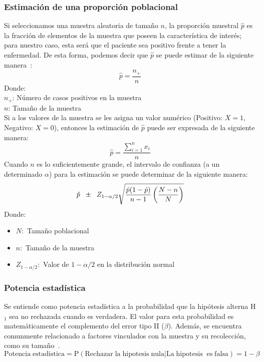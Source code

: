 \subsubsection{Estimación de una proporción poblacional}
Si seleccionamos una muestra aleatoria de tamaño $n$, la proporción muestral $\hat{p}$ es la fracción de elementos de la muestra que poseen la característica de interés; para nuestro caso, esta será que el paciente sea positivo frente a tener la enfermedad. De esta forma, podemos decir que $\hat{p}$ se puede estimar de la siguiente manera~\cite{scheaffer2006elementos}:
\begin{equation} \label{estpropcant}
    \hat{p} = \frac{n_+}{n}
\end{equation}
Donde:\\
\hspace*{2cm} $n_+$: Número de casos positivos en la muestra\\
\hspace*{2cm} $n$\hspace*{0.27cm}: Tamaño de la muestra\\
Si a los valores de la muestra se les asigna un valor numérico (Positivo: $X=1$, Negativo: $X=0$), entonces la estimación de $\hat{p}$ puede ser expresada de la siguiente manera:
\begin{equation}\label{estprop}
    \hat{p} = \frac{\sum_{i=1}^{n}{x_i}}{n}
\end{equation}
Cuando $n$ es lo suficientemente grande, el intervalo de confianza (a un determinado $\alpha$) para la estimación se puede determinar de la siguiente manera:
\begin{equation*}
    \hat{p} \hspace{0.2cm} \pm \hspace{0.2cm} Z_{1-\alpha/2} \sqrt{\frac{\hat{p}(1-\hat{p})}{n-1} \left( \frac{N-n}{N} \right)}
\end{equation*}
Donde:
\begin{itemize}[noitemsep,nolistsep]
    \item[] $N:$ Tamaño poblacional
    \item[] $n:$ Tamaño de la muestra
    \item[] $Z_{1-\alpha/2}:$ Valor de $1-\alpha/2$ en la distribución normal
\end{itemize}

\subsubsection{Potencia estadística}
Se entiende como potencia estadística a la probabilidad que la hipótesis alterna H$_{1}$ sea no rechazada cuando es verdadera. El valor para esta probabilidad es matemáticamente el complemento del error tipo II ($\beta$). Además, se encuentra comunmente relacionado a factores vinculados con la muestra y su recolección, como su tamaño~\cite{ellis2010essential}.
\begin{equation*}
	\mathrm{Potencia\;estadistica} = \mathrm{P} (\mathrm{Rechazar\;la\;hipotesis\;nula}|\mathrm{La\;hipotesis\;\;es\;falsa})=1-\beta 
\end{equation*}


